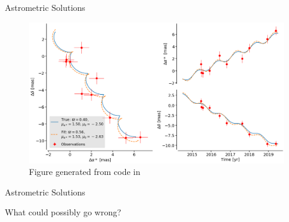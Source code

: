 \documentclass[hyperref={colorlinks = true, linkcolor=blue},8pt]{beamer}
\begin{document}
\begin{frame}{Astrometric Solutions}

		\begin{figure}
			\includegraphics[width=\columnwidth]{astrometric-good.png}
			\caption{Figure generated from code in\cite{luriGaia2018}}
		\end{figure}

\end{frame}


\begin{frame}{Astrometric Solutions}

\center
\Huge What could possibly go wrong?
\end{frame}
\end{document}
